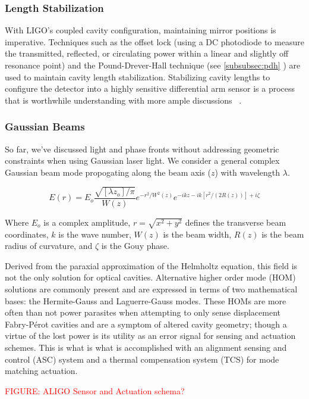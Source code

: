 \subsubsection{Length Stabilization}
With LIGO's coupled cavity configuration, maintaining mirror positions is imperative. Techniques such as the offset lock (using a DC photodiode to measure the transmitted, reflected, or circulating power within a linear and slightly off resonance point) \cite{} and the Pound-Drever-Hall technique (see \ref{subsubsec:pdh} ) are used to maintain cavity length stabilization. Stabilizing cavity lengths to configure the detector into a highly sensitive differential arm sensor is a process that is worthwhile understanding with more ample discussions ~\cite{Mullavey:12}.

\subsubsection{Gaussian Beams}
So far, we've discussed light and phase fronts without addressing geometric constraints when using Gaussian laser light. We consider a general complex Gaussian beam mode propogating along the beam axis ($z$) with wavelength $\lambda$.

\begin{equation}\label{eq:gaussian_beam}
E(r) = E_o \frac{\sqrt{[\lambda z_o] / \pi}}{W(z)}e^{-r^2 / W^2(z)} e^{-ikz - ik[r^2 / (2R(z))] + i \zeta}
\end{equation}

Where $E_o$ is a complex amplitude, $r = \sqrt{x^2 + y^2}$ defines the transverse beam coordinates, $k$ is the wave number, $W(z)$ is the beam width, $R(z)$ is the beam radius of curvature, and $\zeta$ is the Gouy phase.

Derived from the paraxial approximation of the Helmholtz equation, this field is not the only solution for optical cavities. Alternative higher order mode (HOM) solutions are commonly present and are expressed in terms of two mathematical bases: the Hermite-Gauss and Laguerre-Gauss modes. These HOMs are more often than not power parasites when attempting to only sense displacement Fabry-P\'{e}rot cavities and are a symptom of altered cavity geometry; though a virtue of the lost power is its utility as an error signal for sensing and actuation schemes. This is what is what is accomplished with an alignment sensing and control (ASC) system and a thermal compensation system (TCS) for mode matching actuation.

\textcolor{red}{FIGURE: ALIGO Sensor and Actuation schema?}


